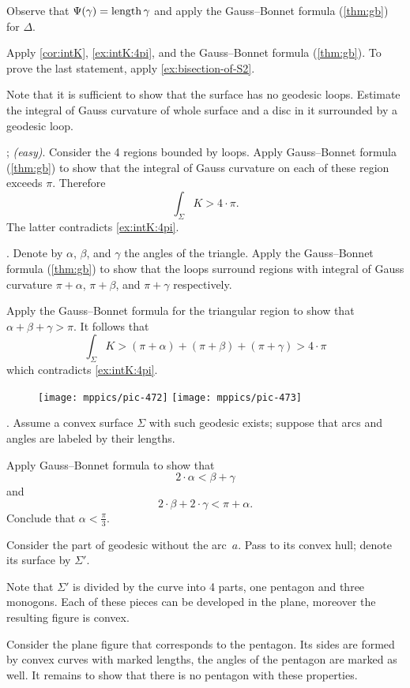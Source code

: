Observe that $\Psi({\gamma})=\mathop{\rm length}\nolimits\gamma$ and apply  the Gauss--Bonnet formula (\ref{thm:gb}) for $\Delta$.

Apply \ref{cor:intK}, \ref{ex:intK:4pi}, and the Gauss--Bonnet formula (\ref{thm:gb}).
To prove the last statement, apply \ref{ex:bisection-of-S2}.

 Note that it is sufficient to show that the surface has no geodesic loops.
Estimate the integral of Gauss curvature of whole surface and a disc in it surrounded by a geodesic loop.

\parbf{\ref{ex:self-intersections}}; \textit{(easy)}.
Consider the 4 regions bounded by loops.
Apply Gauss--Bonnet formula (\ref{thm:gb}) to show that the integral of Gauss curvature on each of these region exceeds $\pi$.
Therefore 
\[\int_\Sigma K>4\cdot\pi.\]
The latter contradicts \ref{ex:intK:4pi}.

.
Denote by $\alpha$, $\beta$, and $\gamma$ the angles of the triangle.
Apply the Gauss--Bonnet formula (\ref{thm:gb}) to show that the loops surround regions with integral of Gauss curvature $\pi+\alpha$, $\pi+\beta$, and $\pi+\gamma$ respectively.

Apply the Gauss--Bonnet formula for the triangular region to show that $\alpha+\beta+\gamma>\pi$.
It follows that 
\[\int_\Sigma K>(\pi+\alpha)+(\pi+\beta)+(\pi+\gamma)>4\cdot\pi\]
which contradicts \ref{ex:intK:4pi}.

\begin{wrapfigure}{r}{33 mm}
\vskip-0mm
\centering
\texttt{[image: mppics/pic-472]}
\bigskip
\texttt{[image: mppics/pic-473]}
\vskip4mm
\end{wrapfigure}

.
Assume a convex surface $\Sigma$ with such geodesic exists;
suppose that arcs and angles are labeled by their lengths.

Apply Gauss--Bonnet formula to show that
\[2\cdot\alpha<\beta+\gamma\]
and 
\[2\cdot\beta+2\cdot \gamma<\pi+\alpha.\]
Conclude that $\alpha <\tfrac \pi 3$.

Consider the part of geodesic without the arc~$a$.
Pass to its convex hull;
denote its surface by $\Sigma'$.

Note that $\Sigma'$ is divided by the curve into 4 parts, one pentagon and three monogons.
Each of these pieces can be developed in the plane, moreover the resulting figure is convex.

Consider the plane figure that corresponds to the pentagon. 
Its sides are formed by convex curves with marked lengths, the angles of the pentagon are marked as well.
It remains to show that there is no pentagon with these properties.









